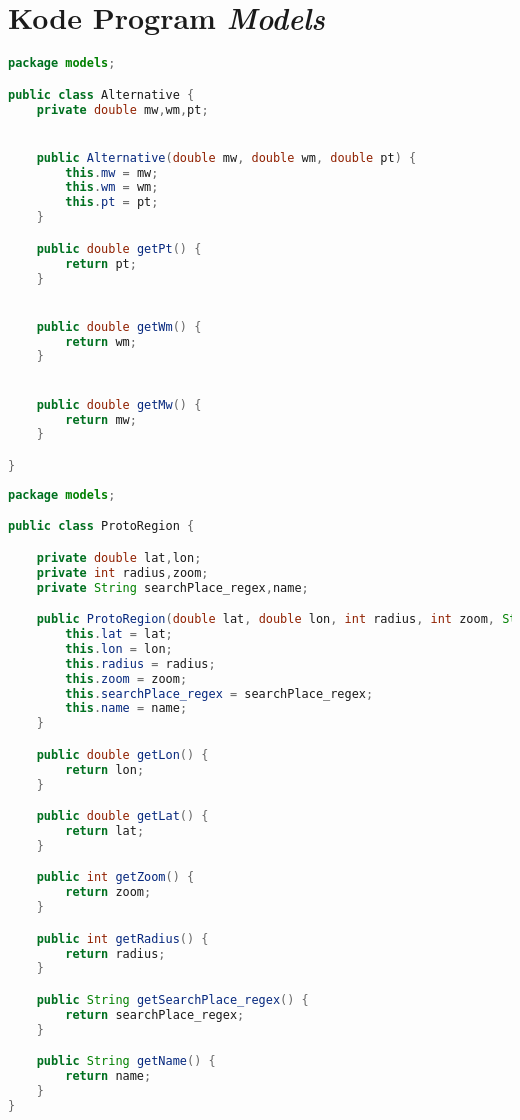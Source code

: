 \chapter{Kode Program \textit{Models}}
\label{app:C}

\singlespacing 
%
%
\begin{lstlisting}[language=Java,basicstyle=\tiny,caption=Alternative.java]
package models;

public class Alternative {
    private double mw,wm,pt;


    public Alternative(double mw, double wm, double pt) {
        this.mw = mw;
        this.wm = wm;
        this.pt = pt;
    }

    public double getPt() {
        return pt;
    }


    public double getWm() {
        return wm;
    }


    public double getMw() {
        return mw;
    }

}


\end{lstlisting}


\begin{lstlisting}[language=Java,basicstyle=\tiny,caption=ProtoRegion.java]
package models;

public class ProtoRegion {

    private double lat,lon;
    private int radius,zoom;
    private String searchPlace_regex,name;

    public ProtoRegion(double lat, double lon, int radius, int zoom, String searchPlace_regex,String name) {
        this.lat = lat;
        this.lon = lon;
        this.radius = radius;
        this.zoom = zoom;
        this.searchPlace_regex = searchPlace_regex;
        this.name = name;
    }

    public double getLon() {
        return lon;
    }

    public double getLat() {
        return lat;
    }

    public int getZoom() {
        return zoom;
    }

    public int getRadius() {
        return radius;
    }

    public String getSearchPlace_regex() {
        return searchPlace_regex;
    }

    public String getName() {
        return name;
    }
}



\end{lstlisting}


